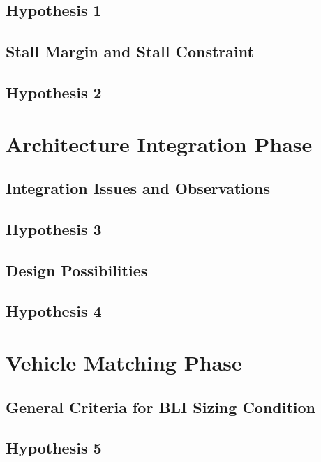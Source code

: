 \subsection{Hypothesis 1}

\subsection{Stall Margin and Stall Constraint}
\subsection{Hypothesis 2}

\section{Architecture Integration Phase}
\subsection{Integration Issues and Observations}
\subsection{Hypothesis 3}
\subsection{Design Possibilities}
\subsection{Hypothesis 4}

\section{Vehicle Matching Phase}
\subsection{General Criteria for BLI Sizing Condition}
\subsection{Hypothesis 5}
